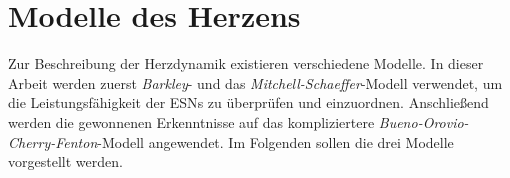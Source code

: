 \section{Modelle des Herzens}
Zur Beschreibung der Herzdynamik existieren verschiedene Modelle. In dieser Arbeit werden zuerst \textit{Barkley}- und das \textit{Mitchell-Schaeffer}-Modell verwendet, um die Leistungsfähigkeit der \textsc{ESN}s zu überprüfen und einzuordnen. Anschließend werden die gewonnenen Erkenntnisse auf das kompliziertere \textit{Bueno-Orovio-Cherry-Fenton}-Modell angewendet. Im Folgenden sollen die drei Modelle vorgestellt werden.





\clearpage